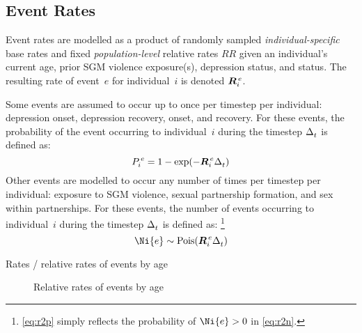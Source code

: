 \subsection{Event Rates}\label{mod.par.evt}
Event rates are modelled as a product of
randomly sampled \emph{individual-specific} base rates \Ri{} and
fixed \emph{population-level} relative rates $RR$
given an individual's current age,
prior SGM violence exposure(s), depression status, and \hazdrink status.
The resulting rate of event~$e$ for individual~$i$ is denoted $\Gi{e}$.
\par
Some events are assumed to occur up to once per timestep per individual:
depression onset, depression recovery,
\hazdrink onset, and \hazdrink recovery.
For these events, the probability of the event occurring to individual~$i$
during the timestep $\Delta_t^{}$ is defined as:
\begin{equation}\label{eq:r2p}
  \Pi{e} = 1 - \exp(-\Gi{e}\dt)
\end{equation}
Other events are modelled to occur
any number of times per timestep per individual:
exposure to SGM violence,
sexual partnership formation,
and sex within partnerships.
For these events, the number of events occurring to individual~$i$
during the timestep $\Delta_t^{}$ is defined as:%
\footnote{\eqref{eq:r2p} simply reflects
  the probability of $\Ni{e} > 0$ in \eqref{eq:r2n}.}
\begin{equation}\label{eq:r2n}
  \Ni{e} \sim \pois(\Gi{e}\dt)
\end{equation}
\begin{table}
  \caption{Rates / relative rates of events by age}
  \label{tab:rr.age}
  \centering
\end{table}
\begin{figure}[t]
  \centering[TODO]
  \caption{Relative rates of events by age}
  \label{fig:age.rr}
\end{figure}
